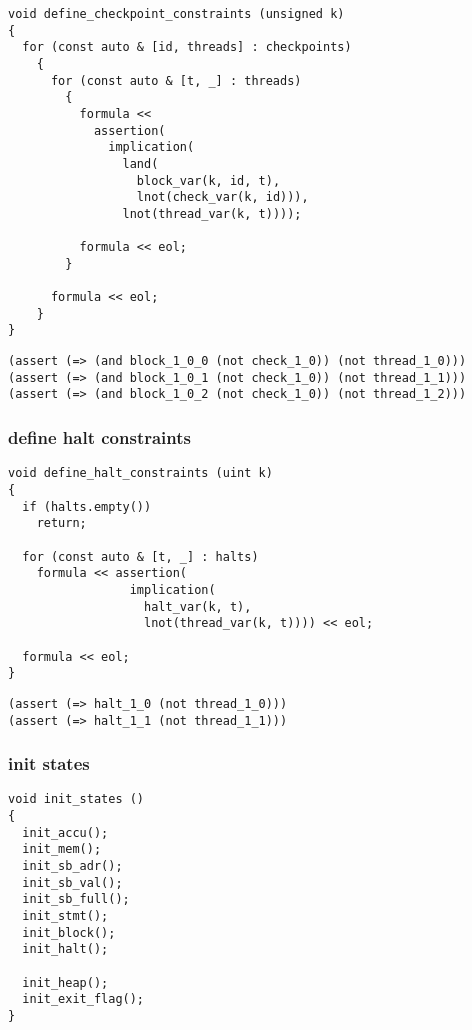 \begin{lstlisting}[style=c++]
void define_checkpoint_constraints (unsigned k)
{
  for (const auto & [id, threads] : checkpoints)
    {
      for (const auto & [t, _] : threads)
        {
          formula <<
            assertion(
              implication(
                land(
                  block_var(k, id, t),
                  lnot(check_var(k, id))),
                lnot(thread_var(k, t))));

          formula << eol;
        }

      formula << eol;
    }
}
\end{lstlisting}

\begin{lstlisting}[language=SMTLib]
(assert (=> (and block_1_0_0 (not check_1_0)) (not thread_1_0)))
(assert (=> (and block_1_0_1 (not check_1_0)) (not thread_1_1)))
(assert (=> (and block_1_0_2 (not check_1_0)) (not thread_1_2)))
\end{lstlisting}

\subsubsection{define halt constraints}

\begin{lstlisting}[style=c++]
void define_halt_constraints (uint k)
{
  if (halts.empty())
    return;

  for (const auto & [t, _] : halts)
    formula << assertion(
                 implication(
                   halt_var(k, t),
                   lnot(thread_var(k, t)))) << eol;

  formula << eol;
}
\end{lstlisting}

\begin{lstlisting}[language=SMTLib]
(assert (=> halt_1_0 (not thread_1_0)))
(assert (=> halt_1_1 (not thread_1_1)))
\end{lstlisting}

\subsubsection{init states}

\begin{lstlisting}[style=c++]
void init_states ()
{
  init_accu();
  init_mem();
  init_sb_adr();
  init_sb_val();
  init_sb_full();
  init_stmt();
  init_block();
  init_halt();

  init_heap();
  init_exit_flag();
}
\end{lstlisting}


